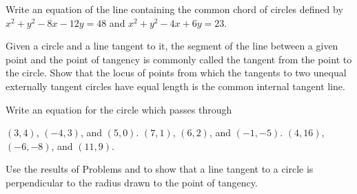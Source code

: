 \begin{exercises}
Write an equation of the line containing the common chord
of circles defined by
$x^2 + y^2 - 8x - 12y = 48$ and
$x^2 + y^2 - 4x + 6y = 23$.

Given a circle and a line tangent to it,
the segment of the line between a given point and the point
of tangency is commonly called the tangent from the point
to the circle.  Show that the locus of points from which the
tangents to two unequal externally tangent circles have equal
length is the common internal tangent line.

Write an equation for the circle which passes through
\begin{exenum}
\sx
$(3,4)$, $(-4,3)$, and $(5,0)$.
\sx
$(7,1)$, $(6,2)$, and $(-1,-5)$.
\sx
$(4,16)$, $(-6,-8)$, and $(11,9)$.
\end{exenum}

Use the results of Problems  and 
to show that a line tangent to a circle is perpendicular
to the radius drawn to the point of tangency.

\end{exercises}
